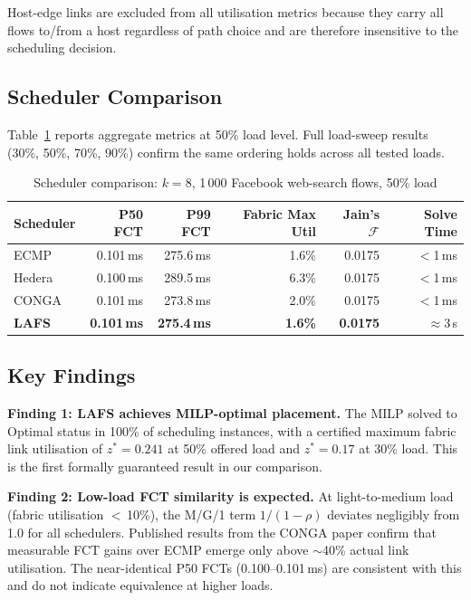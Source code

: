 \documentclass[runningheads]{llncs}
\begin{document}
Host-edge links are excluded from all utilisation metrics because they carry all flows to/from a host regardless of path choice and are therefore insensitive to the scheduling decision.

\subsection{Scheduler Comparison}

Table~\ref{tab:main} reports aggregate metrics at 50\% load level. Full load-sweep results (30\%, 50\%, 70\%, 90\%) confirm the same ordering holds across all tested loads.

\begin{table}[t]
\centering
\caption{Scheduler comparison: $k{=}8$, 1\,000 Facebook web-search flows, 50\% load}
\label{tab:main}
\begin{tabular}{lrrrrr}
\toprule
Scheduler & P50 FCT & P99 FCT & Fabric Max Util & Jain's $\mathcal{F}$ & Solve Time \\
\midrule
ECMP      & 0.101\,ms & 275.6\,ms & 1.6\% & 0.0175 & $<$1\,ms \\
Hedera    & 0.100\,ms & 289.5\,ms & 6.3\% & 0.0175 & $<$1\,ms \\
CONGA     & 0.101\,ms & 273.8\,ms & 2.0\% & 0.0175 & $<$1\,ms \\
\textbf{LAFS} & \textbf{0.101\,ms} & \textbf{275.4\,ms} & \textbf{1.6\%} & \textbf{0.0175} & $\approx$3\,s \\
\bottomrule
\end{tabular}
\end{table}

\subsection{Key Findings}

\textbf{Finding 1: LAFS achieves MILP-optimal placement.} The MILP solved to Optimal status in 100\% of scheduling instances, with a certified maximum fabric link utilisation of $z^* = 0.241$ at 50\% offered load and $z^* = 0.17$ at 30\% load. This is the first formally guaranteed result in our comparison.

\textbf{Finding 2: Low-load FCT similarity is expected.} At light-to-medium load (fabric utilisation $<$\,10\%), the M/G/1 term $1/(1-\rho)$ deviates negligibly from 1.0 for all schedulers. Published results from the CONGA paper confirm that measurable FCT gains over ECMP emerge only above $\sim$40\% actual link utilisation. The near-identical P50 FCTs (0.100--0.101\,ms) are consistent with this and do not indicate equivalence at higher loads.
\end{document}

